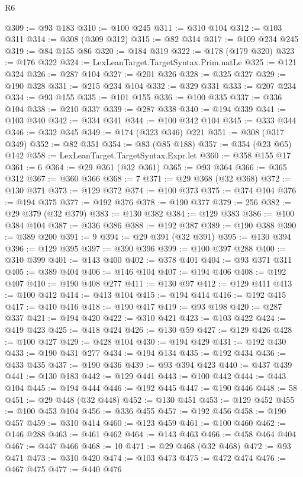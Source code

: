 \begin{lexlean}{R6}
\begin{coremodule}
@309 := @93 @183
@310 := @100 @245
@311 := @310 @104
@312 := @103 @311
@314 := @308 (@309 @312)
@315 := @82 @314
@317 := @109 @234 @245
@319 := @84 @155 @86
@320 := @184 @319
@322 := @178 (@179 @320)
@323 := @176 @322
@324 := LexLeanTarget.TargetSyntax.Prim.natLe
@325 := @121 @324
@326 := @287 @104
@327 := @201 @326
@328 := @325 @327
@329 := @190 @328
@331 := @215 @234 @104
@332 := @329 @331
@333 := @207 @234
@334 := @93 @155
@335 := @101 @155
@336 := @100 @335
@337 := @336 @104
@338 := @210 @337
@339 := @287 @338
@340 := @194 @339
@341 := @103 @340
@342 := @334 @341
@344 := @100 @342 @104
@345 := @333 @344
@346 := @332 @345
@349 := @174 (@323 @346) @221
@351 := @308 (@317 @349)
@352 := @82 @351
@354 := @83 (@85 @188)
@357 := @354 (@23 @65) @142
@358 := LexLeanTarget.TargetSyntax.Expr.let
@360 := @358 @155 @17
@361 := 6
@364 := @29 @361 (@32 @361)
@365 := @93 @364
@366 := @365 @312
@367 := @360 @366
@368 := 7
@371 := @29 @368 (@32 @368)
@372 := @130 @371
@373 := @129 @372
@374 := @100 @373
@375 := @374 @104
@376 := @194 @375
@377 := @192 @376
@378 := @190 @377
@379 := 256
@382 := @29 @379 (@32 @379)
@383 := @130 @382
@384 := @129 @383
@386 := @100 @384 @104
@387 := @336 @386
@388 := @192 @387
@389 := @190 @388
@390 := @389 @200
@391 := 9
@394 := @29 @391 (@32 @391)
@395 := @130 @394
@396 := @129 @395
@397 := @390 @396
@399 := @100 @397 @288
@400 := @310 @399
@401 := @143 @400
@402 := @378 @401
@404 := @93 @371 @311
@405 := @389 @404
@406 := @146 @104
@407 := @194 @406
@408 := @192 @407
@410 := @190 @408 @277
@411 := @130 @97
@412 := @129 @411
@413 := @100 @412
@414 := @413 @104
@415 := @194 @414
@416 := @192 @415
@417 := @410 @416
@418 := @190 @417
@419 := @93 @198
@420 := @287 @337
@421 := @194 @420
@422 := @310 @421
@423 := @103 @422
@424 := @419 @423
@425 := @418 @424
@426 := @130 @59
@427 := @129 @426
@428 := @100 @427
@429 := @428 @104
@430 := @194 @429
@431 := @192 @430
@433 := @190 @431 @277
@434 := @194 @134
@435 := @192 @434
@436 := @433 @435
@437 := @190 @436
@439 := @93 @394 @423
@440 := @437 @439
@441 := @130 @183
@442 := @129 @441
@443 := @100 @442
@444 := @443 @104
@445 := @194 @444
@446 := @192 @445
@447 := @190 @446
@448 := 58
@451 := @29 @448 (@32 @448)
@452 := @130 @451
@453 := @129 @452
@455 := @100 @453 @104
@456 := @336 @455
@457 := @192 @456
@458 := @190 @457
@459 := @310 @414
@460 := @123 @459
@461 := @100 @460
@462 := @146 @288
@463 := @461 @462
@464 := @143 @463
@466 := @458 @464 @404
@467 := @447 @466
@468 := 10
@471 := @29 @468 (@32 @468)
@472 := @93 @471
@473 := @310 @420
@474 := @103 @473
@475 := @472 @474
@476 := @467 @475
@477 := @440 @476

\end{coremodule}
\end{lexlean}
